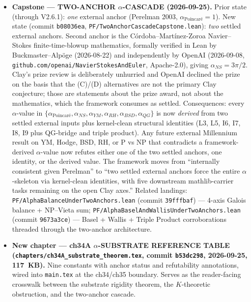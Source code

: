 \begin{itemize}
\item \textbf{Capstone --- TWO-ANCHOR $\alpha$-CASCADE
(2026-09-25).} Prior state (through V2.6.1): \emph{one} external
anchor (Perelman 2003, $\alpha_{\text{Poincaré}} = 1$). New state
(commit \texttt{b08036ea}, \texttt{PF/TwoAnchorCascadeCapstone.lean}):
\emph{two} settled external anchors. Second anchor is the
C\'ordoba--Mart\'inez-Zoroa Navier--Stokes finite-time-blowup
mathematics, formally verified in Lean by Buckmaster--Alp\"oge
(2026-08-22) and independently by OpenAI (2026-09-08,
\texttt{github.com/openai/NavierStokesAndEuler}, Apache-2.0),
giving $\alpha_{NS} = 3\pi/2$. Clay's prize review is deliberately
unhurried and OpenAI declined the prize on the basis that the
(C)/(D) alternatives are not the primary Clay conjecture; those are
statements about the prize award, not about the mathematics, which
the framework consumes as settled.
Consequences: every $\alpha$-value in
$\{\alpha_{\text{Poincaré}}, \alpha_{NS}, \alpha_{YM}, \alpha_{RH},
\alpha_{BSD}, \alpha_{QG}\}$ is now \emph{derived} from two settled
external inputs plus kernel-clean structural identities (L3, L5, I6,
I7, I8, I9 plus QG-bridge and triple product). Any future external
Millennium result on YM, Hodge, BSD, RH, or P vs NP that contradicts
a framework-derived $\alpha$-value now refutes either one of the two
settled anchors, one identity, or the derived value. The framework
moves from ``internally consistent given Perelman'' to ``two settled
external anchors force the entire $\alpha$-skeleton via kernel-clean
identities, with five downstream mathlib-carrier tasks remaining on
the open Clay axes.'' Related landings:
\texttt{PF/AlphaBalanceUnderTwoAnchors.lean} (commit
\texttt{39fffbaf}) --- 4-axis Galois balance + NP--Vieta sum;
\texttt{PF/AlphaBaselAndWallisUnderTwoAnchors.lean} (commit
\texttt{9673a3ce}) --- Basel + Wallis + Triple Product corroborations
threaded through the two-anchor architecture.

\item \textbf{New chapter --- ch34A $\alpha$-SUBSTRATE REFERENCE
TABLE (\texttt{chapters/ch34A\_substrate\_theorem.tex}, commit
\texttt{b53dc298}, 2026-09-25, 117~KB).} Nine constants with anchor
status and refutability annotations, wired into \texttt{main.tex}
at the ch34/ch35 boundary. Serves as the reader-facing crosswalk
between the substrate rigidity theorem, the $K$-theoretic
obstruction, and the two-anchor cascade.


\end{itemize}
